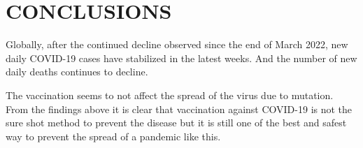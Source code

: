 \documentclass[11pt,a4paper,]{article}
\begin{document}
\hypertarget{conclusions}{%
\section{\texorpdfstring{\textbf{CONCLUSIONS}}{CONCLUSIONS}}\label{conclusions}}

Globally, after the continued decline observed since the end of March 2022, new daily COVID-19 cases have stabilized in the latest weeks. And the number of new daily deaths continues to decline.

The vaccination seems to not affect the spread of the virus due to mutation.
From the findings above it is clear that vaccination against COVID-19 is not the sure shot method to prevent the disease but it is still one of the best and safest way to prevent the spread of a pandemic like this.

\printbibliography
\end{document}
